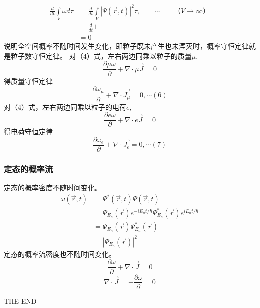 \begin{frame} [allowframebreaks=]
    \begin{equation*}
        \begin{split}
        \frac{d}{d t} \int\limits_{V} \omega d \tau &= \frac{d}{d t} \int\limits_{V} |\Psi(\vec{r}, t)|^{2} \tau ,\qquad \cdots \qquad （V \to \infty）  \\
        &=\frac{d}{d t} 1\\ 
        &=0
        \end{split}
    \end{equation*}
    说明全空间概率不随时间发生变化，即粒子既未产生也未湮灭时，概率守恒定律就是粒子数守恒定律。
    对（4）式，左右两边同乘以粒子的质量$\mu$, 
    \begin{equation*}
        \frac{\partial \mu\omega}{\partial}+ \nabla \cdot \mu\vec{J}=0
    \end{equation*}  
    得质量守恒定律
    \begin{equation*}
        \frac{\partial \omega_\mu}{\partial}+ \nabla \cdot \vec{J_\mu}=0, \cdots (6)
    \end{equation*}  
    对（4）式，左右两边同乘以粒子的电荷$e$, 
    \begin{equation*}
        \frac{\partial e\omega}{\partial}+ \nabla \cdot e\vec{J}=0
    \end{equation*}  
    得电荷守恒定律
    \begin{equation*}
        \frac{\partial \omega_e}{\partial}+ \nabla \cdot \vec{J_e}=0, \cdots (7)
    \end{equation*}  
\end{frame}

\begin{frame} [allowframebreaks=]
    \frametitle{定态的概率流}
    定态的概率密度不随时间变化。
    \begin{equation*}
        \begin{split}
            \omega (\vec{r}, t)&=\Psi^{*}(\vec{r}, t) \Psi(\vec{r}, t) \\
            &=\Psi_{E_n} (\vec{r} ) e^{-iE_n t/\hbar} \Psi_{E_n} ^* (\vec{r} ) e^{iE_n t/\hbar} \\
            &=\Psi_{E_n} (\vec{r} )\Psi_{E_n} ^* (\vec{r} ) \\
            &=|\Psi_{E_n} (\vec{r} )|^2
        \end{split}
    \end{equation*}
    定态的概率流密度也不随时间变化。 
    \begin{equation*}
        \frac{\partial \omega}{\partial}+ \nabla \cdot \vec{J}=0
    \end{equation*}  
    \to
    \begin{equation*}
        \nabla \cdot \vec{J}=-\frac{\partial \omega}{\partial}=0
    \end{equation*}  
\end{frame}

\begin{frame}
    THE END
\end{frame}



